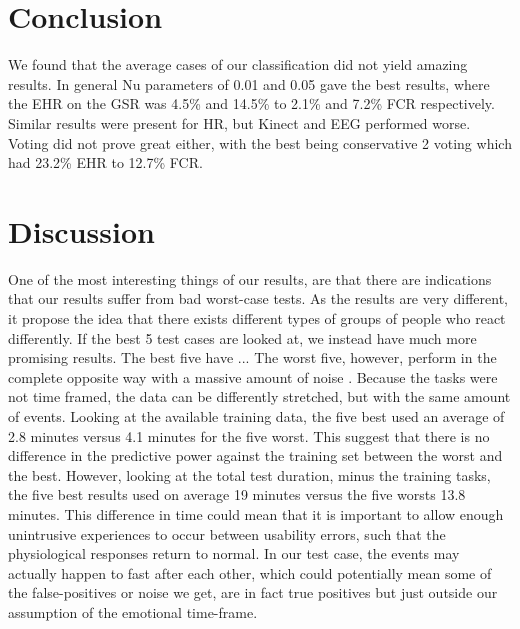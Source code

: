 \section{Conclusion}
We found that the average cases of our classification did not yield amazing results.
In general Nu parameters of 0.01 and 0.05 gave the best results, where the EHR on the GSR was 4.5\% and 14.5\% to 2.1\% and 7.2\% FCR respectively. Similar results were present for HR, but Kinect and EEG performed worse. 
Voting did not prove great either, with the best being conservative 2 voting which had 23.2\% EHR to 12.7\% FCR. 

\section{Discussion}
One of the most interesting things of our results, are that there are indications that our results suffer from bad worst-case tests. As the results are very different, it propose the idea that there exists different types of groups of people who react differently. If the best 5 test cases are looked at, we instead have much more promising results. The best five have ...
The worst five, however, perform in the complete opposite way with a massive amount of noise .
Because the tasks were not time framed, the data can be differently stretched, but with the same amount of events. Looking at the available training data, the five best used an average of 2.8 minutes versus 4.1 minutes for the five worst. This suggest that there is no difference in the predictive power against the training set between the worst and the best. However, looking at the total test duration, minus the training tasks, the five best results used on average 19 minutes versus the five worsts 13.8 minutes. This difference in time could mean that it is important to allow enough unintrusive experiences to occur between usability errors, such that the physiological responses return to normal. In our test case, the events may actually happen to fast after each other, which could potentially mean some of the false-positives or noise we get, are in fact true positives but just outside our assumption of the emotional time-frame.

